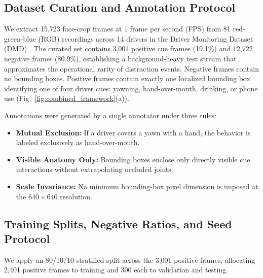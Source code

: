 \documentclass[conference]{IEEEtran}
\begin{document}
\subsection{Dataset Curation and Annotation Protocol}
\label{subsec:data}
We extract 15,723 face-crop frames at 1 frame per second (FPS) from 81 red-green-blue (RGB) recordings across 14 drivers in the Driver Monitoring Dataset (DMD) \cite{ortega2020dmd}. The curated set contains 3,001 positive cue frames (19.1\%) and 12,722 negative frames (80.9\%), establishing a background-heavy test stream that approximates the operational rarity of distraction events. Negative frames contain no bounding boxes. Positive frames contain exactly one localized bounding box identifying one of four driver cues: yawning, hand-over-mouth, drinking, or phone use (Fig.~\ref{fig:combined_framework}(a)).

Annotations were generated by a single annotator under three rules:
\begin{itemize}
    \item \textbf{Mutual Exclusion:} If a driver covers a yawn with a hand, the behavior is labeled exclusively as hand-over-mouth.
    \item \textbf{Visible Anatomy Only:} Bounding boxes enclose only directly visible cue interactions without extrapolating occluded joints.
    \item \textbf{Scale Invariance:} No minimum bounding-box pixel dimension is imposed at the $640 \times 640$ resolution.
\end{itemize}

\subsection{Training Splits, Negative Ratios, and Seed Protocol}
\label{subsec:splits}
We apply an 80/10/10 stratified split across the 3,001 positive frames, allocating 2,401 positive frames to training and 300 each to validation and testing.
\end{document}
